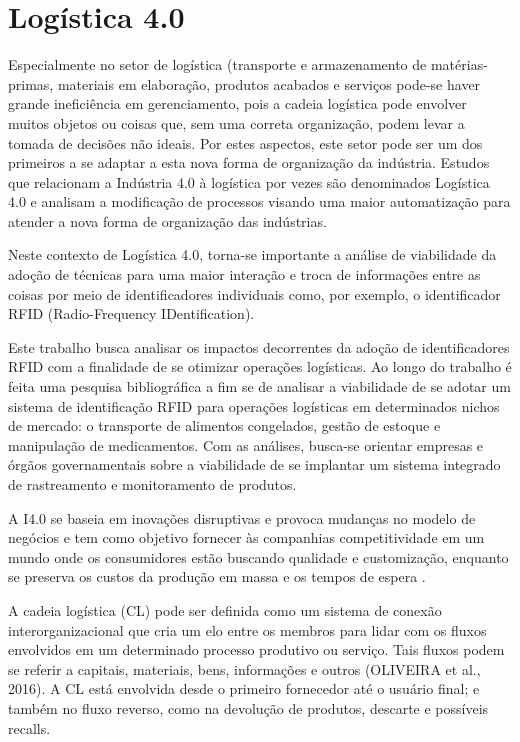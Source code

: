 \documentclass[
	12pt,				%
	oneside,			%
	a4paper,			%
	english,			%
	brazil				%
]{abntex2}
\begin{document}
	
	\section{Logística 4.0}
	
	Especialmente no setor de logística (transporte e armazenamento de matérias-primas, materiais em elaboração, produtos acabados e serviços \cite{cscmp2013supplychainglossary} pode-se haver grande ineficiência em gerenciamento, pois a cadeia logística pode envolver muitos objetos ou coisas que, sem uma correta organização, podem levar a tomada de decisões não ideais. Por estes aspectos, este setor pode ser um dos primeiros a se adaptar a esta nova forma de organização da indústria. Estudos que relacionam a Indústria 4.0 à logística por vezes são denominados Logística 4.0 e analisam a modificação de processos visando uma maior automatização para atender a nova forma de organização das indústrias.

	Neste contexto de Logística 4.0, torna-se importante a análise de viabilidade da adoção de técnicas para uma maior interação e troca de informações entre as coisas por meio de identificadores individuais como, por exemplo, o identificador RFID (Radio-Frequency IDentification). 

	Este trabalho busca analisar os impactos decorrentes da adoção de identificadores RFID com a finalidade de se otimizar operações logísticas. Ao longo do trabalho é feita uma pesquisa bibliográfica a fim se de analisar a viabilidade de se adotar um sistema de identificação RFID para operações logísticas em determinados nichos de mercado: o transporte de alimentos congelados, gestão de estoque e manipulação de medicamentos. Com as análises, busca-se orientar empresas e órgãos governamentais sobre a viabilidade de se implantar um sistema integrado de rastreamento e monitoramento de produtos.

	A I4.0 se baseia em inovações disruptivas e provoca mudanças no modelo de negócios e tem como objetivo fornecer às companhias competitividade em um mundo onde os consumidores estão buscando qualidade e customização, enquanto se preserva os custos da produção em massa e os tempos de espera \cite{schwab2016fourth}.

	A cadeia logística (CL) pode ser definida como um sistema de conexão interorganizacional que cria um elo entre os membros para lidar com os fluxos envolvidos em um determinado processo produtivo ou serviço. Tais fluxos podem se referir a capitais, materiais, bens, informações e outros (OLIVEIRA et al., 2016). A CL está envolvida desde o primeiro fornecedor até o usuário final; e também no fluxo reverso, como na devolução de produtos, descarte e possíveis recalls.
\end{document}
